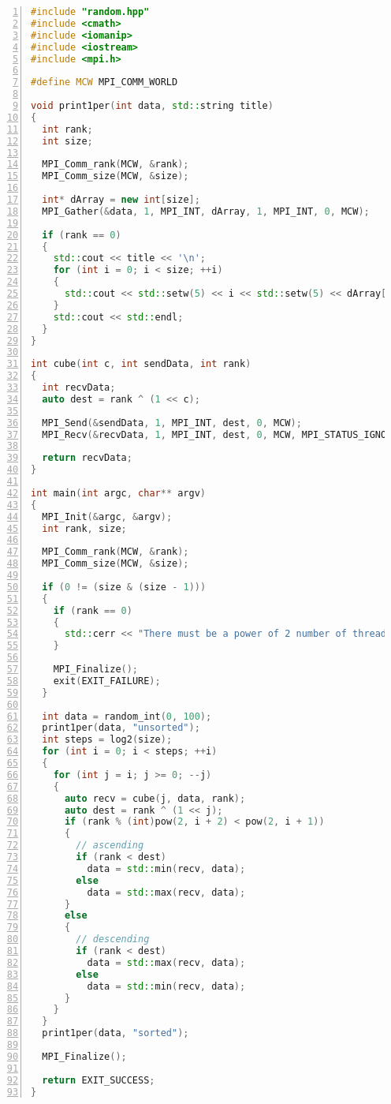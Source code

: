 \documentclass{article}
\begin{document}
\begin{lstlisting}[showstringspaces=false, language=c++, numbers=left]
#include "random.hpp"
#include <cmath>
#include <iomanip>
#include <iostream>
#include <mpi.h>

#define MCW MPI_COMM_WORLD

void print1per(int data, std::string title)
{
  int rank;
  int size;

  MPI_Comm_rank(MCW, &rank);
  MPI_Comm_size(MCW, &size);

  int* dArray = new int[size];
  MPI_Gather(&data, 1, MPI_INT, dArray, 1, MPI_INT, 0, MCW);

  if (rank == 0)
  {
    std::cout << title << '\n';
    for (int i = 0; i < size; ++i)
    {
      std::cout << std::setw(5) << i << std::setw(5) << dArray[i] << "\n";
    }
    std::cout << std::endl;
  }
}

int cube(int c, int sendData, int rank)
{
  int recvData;
  auto dest = rank ^ (1 << c);

  MPI_Send(&sendData, 1, MPI_INT, dest, 0, MCW);
  MPI_Recv(&recvData, 1, MPI_INT, dest, 0, MCW, MPI_STATUS_IGNORE);

  return recvData;
}

int main(int argc, char** argv)
{
  MPI_Init(&argc, &argv);
  int rank, size;

  MPI_Comm_rank(MCW, &rank);
  MPI_Comm_size(MCW, &size);

  if (0 != (size & (size - 1)))
  {
    if (rank == 0)
    {
      std::cerr << "There must be a power of 2 number of threads\n";
    }

    MPI_Finalize();
    exit(EXIT_FAILURE);
  }

  int data = random_int(0, 100);
  print1per(data, "unsorted");
  int steps = log2(size);
  for (int i = 0; i < steps; ++i)
  {
    for (int j = i; j >= 0; --j)
    {
      auto recv = cube(j, data, rank);
      auto dest = rank ^ (1 << j);
      if (rank % (int)pow(2, i + 2) < pow(2, i + 1))
      {
        // ascending
        if (rank < dest)
          data = std::min(recv, data);
        else
          data = std::max(recv, data);
      }
      else
      {
        // descending
        if (rank < dest)
          data = std::max(recv, data);
        else
          data = std::min(recv, data);
      }
    }
  }
  print1per(data, "sorted");

  MPI_Finalize();

  return EXIT_SUCCESS;
}
\end{lstlisting}
\end{document}
